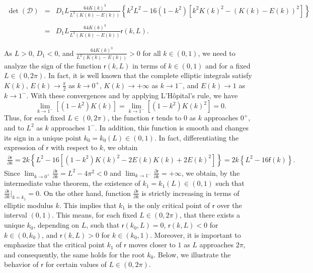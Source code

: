 \documentclass[12pt,reqno,a4paper]{amsart} %
\numberwithin{equation}{section}
\numberwithin{figure}{section}
\begin{document}
 \begin{equation}\label{detD1}\begin{array}{llll}
 \det(\mathcal{D}) 
 &=&D_1L\displaystyle \frac{64K(k)^3}{L^3(K(k)-E(k))}\left\{k^2L^{2} -16(1-k^{2})  \left[k^{2}K(k)^{2} - (K(k)-E(k))^{2}\right] \right\} \\\\ 
&=&\displaystyle D_1L\frac{64K(k)^3}{L^3(K(k)-E(k))}\mathsf{r}(k,L).
 \end{array}
 \end{equation}
 
As $L>0$, $D_1<0$, and $\displaystyle\frac{64K(k)^3}{L^3(K(k)-E(k))}>0$ for all $k\in (0,1)$, we need to analyze the sign of the function $\mathsf{r}(k,L) $ in terms of $k\in (0,1)$ and for a fixed $L\in (0,2\pi)$.  In fact, it is well known that the complete elliptic integrals satisfy 
$\displaystyle K(k),\, E(k) \to \frac{\pi}{2}$ as $k \to 0^{+}$, $K(k) \to +\infty$ as $k \to 1^{-}$, 
and $E(k) \to 1 $ as $k \to 1^{-}$. With these convergences and by applying L’Hôpital’s rule, we have 
 $$\displaystyle\lim_{k\rightarrow1^-}\left[(1-k^2)K (k)  \right]=\lim_{k\rightarrow1^-}\left[(1-k^2)K (k)^2 \right]=0.$$
Thus, for each fixed $L\in(0,2\pi)$, the function $\mathsf{r}$ tends to $0$ as $k$ approaches $0^+$, and to $L^{2}$ as $k$ approaches $1^{-}$. In addition, this function is smooth and changes its sign in a unique point $k_0=k_0(L)\in(0,1)$. In fact, differentiating the expression of $\mathsf{r}$ with respect to $k$, we obtain
\begin{align}\label{detD1.eq2}\nonumber
	\frac{\partial\mathsf{r}}{\partial k}= 2k\left\{   L^2-16 \left[ (1-k^2)K(k)^2-2E(k)K(k)+2E(k)^2\right]\right\} 
	=2k\left\{   L^2-16\mathsf{f}(k)\right\}.
\end{align}
Since $\displaystyle\lim_{k\rightarrow 0^{+}}\frac{\partial\mathsf{r}}{\partial k}=L^2-4\pi^2<0$ and $\displaystyle\lim_{k\rightarrow 1^{-}}\frac{\partial\mathsf{r}}{\partial k}=+\infty$, we obtain, by the intermediate value theorem, the existence of $k_1=k_1(L)\in(0,1)$ such that  $\displaystyle \frac{\partial\mathsf{r}}{\partial k}\Big|_{k=k_1}=0$. On the other hand, function $\displaystyle\frac{\partial\mathsf{r}}{\partial k}$ is strictly increasing in terms of elliptic modulus $k$. This implies that $k_1$ is the only critical point of $\mathsf{r}$ over the interval $(0,1)$. This means, for each fixed $L\in (0,2\pi)$, that there 
exists a unique $k_{0}$, depending on $L$, such that $\mathsf{r}(k_{0},L)=0$, 
$\mathsf{r}(k,L)<0$ for $k\in(0,k_{0})$, and $\mathsf{r}(k,L)>0$ for 
$k\in(k_{0},1)$. Moreover, it is important to emphasize that the critical point $k_1$ of $\mathsf{r}$ moves closer to $1$ as $L$ approaches $2\pi$, and consequently, the same holds for the root $k_0$. Below, we illustrate the behavior of 
$\mathsf{r}$ for certain values of $L\in(0,2\pi)$.
\end{document}
